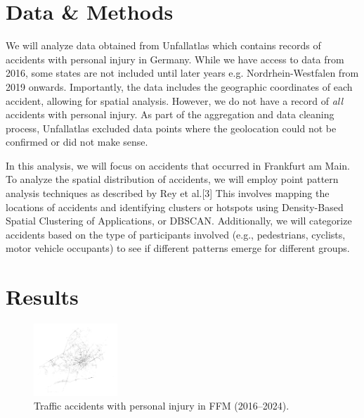\documentclass[10pt,a4paper]{article} %
\begin{document}
\section*{Data \& Methods}
We will analyze data obtained from Unfallatlas which contains records of accidents with personal injury in Germany. While we have access to data from 2016, some states are not included until later years e.g. Nordrhein-Westfalen from 2019 onwards. Importantly, the data includes the geographic coordinates of each accident, allowing for spatial analysis. However, we do not have a record of \textit{all} accidents with personal injury. As part of the aggregation and data cleaning process, Unfallatlas excluded data points where the geolocation could not be confirmed or did not make sense.\\
\par
In this analysis, we will focus on accidents that occurred in Frankfurt am Main. To analyze the spatial distribution of accidents, we will employ point pattern analysis techniques as described by Rey et al.[3] This involves mapping the locations of accidents and identifying clusters or hotspots using Density-Based Spatial Clustering of Applications, or DBSCAN\@. Additionally, we will categorize accidents based on the type of participants involved (e.g., pedestrians, cyclists, motor vehicle occupants) to see if different patterns emerge for different groups.

\section*{Results}
\begin{figure}
    \centering
    \vspace{-20pt}
    \includegraphics[width=0.28\textwidth]{../src/img/ffm-2016-2024-bw.png} %
    \caption{Traffic accidents with personal injury in FFM (2016--2024).}
    \vspace{-10pt}
\end{figure}
\end{document}
